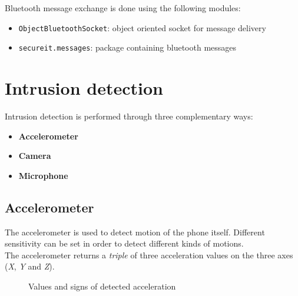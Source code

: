 \documentclass[conference, 11pt]{IEEEtran}
\begin{document}
Bluetooth message exchange is done using the following modules:

\begin{itemize}
	\item \texttt{ObjectBluetoothSocket}: object oriented socket for message delivery
	\item \texttt{secureit.messages}: package containing bluetooth messages
\end{itemize}


\section{\textbf{Intrusion detection}}
Intrusion detection is performed through three complementary ways:
\begin{itemize}
	\item \textbf{Accelerometer}
	\item \textbf{Camera}
	\item \textbf{Microphone}
\end{itemize}

\subsection{\textbf{Accelerometer}}
The accelerometer is used to detect motion of the phone itself. Different sensitivity can be set in order to detect different kinds of motions.\\
The accelerometer returns a \textit{triple} of three acceleration values on the three axes (\textit{X}, \textit{Y} and \textit{Z}). 

\begin{figure}[!ht]
\begin{center}
\caption{Values and signs of detected acceleration}
\end{center}
\end{figure}
\end{document}
